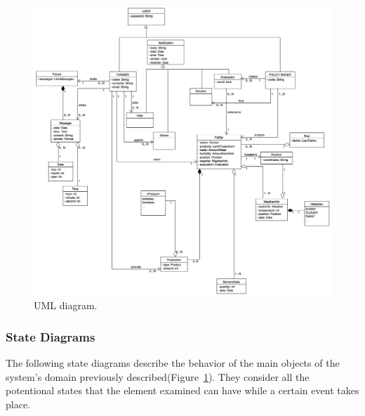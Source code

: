 \begin{figure}[H]
    \begin{center}
    \includegraphics[width=1\textwidth]{images/UMLSW2_3.png}
    \caption{UML diagram.}
    \label{fig:uml}
    \end{center}
\end{figure}
\newpage
\subsubsection{State Diagrams}
The following state diagrams describe the behavior of the main objects of the system's domain previously described(Figure~\ref{fig:uml}). 
They consider all the potentional states that the element examined can have 
while a certain event takes place.

